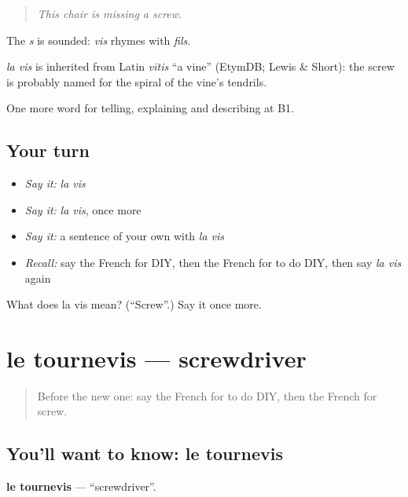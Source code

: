 \begin{quote}
\emph{This chair is missing a screw.}
\end{quote}

The \emph{s} is sounded: \emph{vis} rhymes with \emph{fils}.

\begin{cousinweb}
\emph{la vis} is inherited from Latin \emph{vītis} \textquotedblleft{}a vine\textquotedblright{} (EtymDB; Lewis \& Short): the screw is probably named for the spiral of the vine's tendrils.
\end{cousinweb}

\begin{grammarlens}[title={What you've built}]
One more word for telling, explaining and describing at B1.
\end{grammarlens}

\subsection*{Your turn}
\begin{itemize}
\raggedright
  \item \emph{Say it:} \emph{la vis}
  \item \emph{Say it:} \emph{la vis}, once more
  \item \emph{Say it:} a sentence of your own with \emph{la vis}
  \item \emph{Recall:} say the French for DIY, then the French for to do DIY, then say \emph{la vis} again
\end{itemize}

\begin{tcolorbox}[breakable,colback=teal!4,colframe=teal!35!black,title={Before you move on}]
What does la vis mean? (\textquotedblleft{}Screw\textquotedblright{}.) Say it once more.
\end{tcolorbox}
\section[le tournevis]{le tournevis — screwdriver}

\label{lesson:FR-C531-tournevis}



\begin{quote}
Before the new one: say the French for to do DIY, then the French for screw.
\end{quote}

\subsection*{You'll want to know: le tournevis}
\textbf{le tournevis} — \textquotedblleft{}screwdriver\textquotedblright{}.

